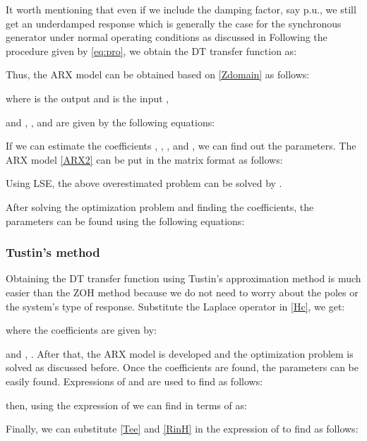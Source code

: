 \documentclass[10pt,journal,final]{IEEEtran}
\begin{document}
It worth mentioning that even if we include the damping factor, say  p.u., we still get an {underdamped} response which is generally the case for the synchronous generator under normal operating conditions as discussed in \cite{bergen2000power} Following the procedure given by \eqref{eq:pro}, we obtain the DT transfer function as:

Thus, the ARX model can be obtained based on \eqref{Zdomain} as follows:

where  is the output  and  is the input ,

and , , and  are given by the following equations:


If we can estimate the coefficients , , , and , we can find out the parameters. The ARX model \eqref{ARX2} can be put in the matrix format  as follows:
\begin{footnotesize}

\end{footnotesize}
Using  LSE, the above overestimated problem can be solved by . 

After solving the optimization problem and finding the coefficients, the parameters can be found using the following {equations}:

\subsubsection{Tustin's method}
Obtaining the DT transfer function using Tustin's approximation method is much easier than the ZOH method {because} we do not need to worry about the poles or the system's type of response. Substitute the {Laplace} operator  in \eqref{Hc}, we get:

where the coefficients are given by:

and , {}.
After that, the ARX model is developed and the optimization problem is solved as discussed before. Once the coefficients are found, the parameters can be easily found. Expressions of  and  are used to find   as follows:

then, using the expression of  we can find  in terms of  as:

Finally, we can {substitute} \eqref{Tee} and \eqref{RinH} in the expression of  to find  as follows:
\end{document}
